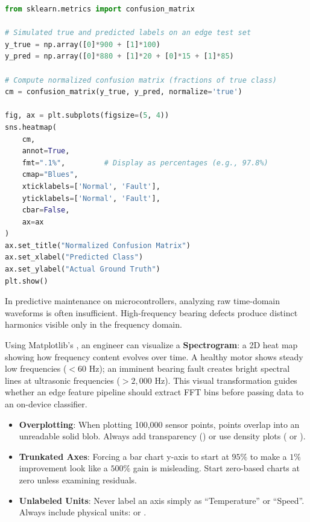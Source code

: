 \begin{lstlisting}[language=Python]
from sklearn.metrics import confusion_matrix

# Simulated true and predicted labels on an edge test set
y_true = np.array([0]*900 + [1]*100)
y_pred = np.array([0]*880 + [1]*20 + [0]*15 + [1]*85)

# Compute normalized confusion matrix (fractions of true class)
cm = confusion_matrix(y_true, y_pred, normalize='true')

fig, ax = plt.subplots(figsize=(5, 4))
sns.heatmap(
    cm, 
    annot=True, 
    fmt=".1%",         # Display as percentages (e.g., 97.8%)
    cmap="Blues", 
    xticklabels=['Normal', 'Fault'],
    yticklabels=['Normal', 'Fault'],
    cbar=False,
    ax=ax
)
ax.set_title("Normalized Confusion Matrix")
ax.set_xlabel("Predicted Class")
ax.set_ylabel("Actual Ground Truth")
plt.show()
\end{lstlisting}

\begin{iotbox}
In predictive maintenance on microcontrollers, analyzing raw time-domain waveforms is often insufficient. High-frequency bearing defects produce distinct harmonics visible only in the frequency domain.

Using Matplotlib's , an engineer can visualize a \textbf{Spectrogram}: a 2D heat map showing how frequency content evolves over time. A healthy motor shows steady low frequencies ($< 60\text{ Hz}$); an imminent bearing fault creates bright spectral lines at ultrasonic frequencies ($> 2{,}000\text{ Hz}$). This visual transformation guides whether an edge feature pipeline should extract FFT bins before passing data to an on-device classifier.
\end{iotbox}

\begin{warning}
\begin{itemize}
    \item \textbf{Overplotting}: When plotting 100,000 sensor points, points overlap into an unreadable solid blob. Always add transparency () or use density plots ( or ).
    \item \textbf{Trunkated Axes}: Forcing a bar chart y-axis to start at $95\%$ to make a $1\%$ improvement look like a $500\%$ gain is misleading. Start zero-based charts at zero unless examining residuals.
    \item \textbf{Unlabeled Units}: Never label an axis simply as ``Temperature'' or ``Speed''. Always include physical units:  or .
\end{itemize}
\end{warning}

